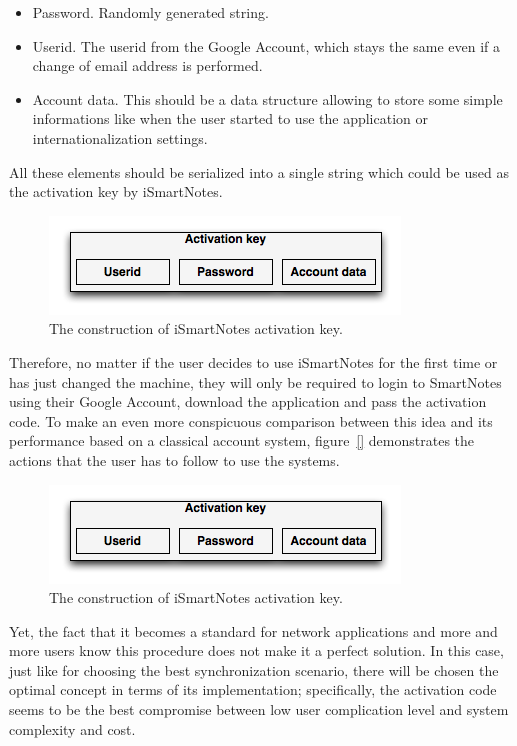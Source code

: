 \begin{itemize}
\item{Password. Randomly generated string.}
\item{Userid. The userid from the Google Account, which stays the same even if a change of email address is performed.}
\item{Account data. This should be a data structure allowing to store some simple informations like when the user started to use the application or internationalization settings.}
\end{itemize}
All these elements should be serialized into a single string which could be used as the activation key by iSmartNotes. 
\begin{figure}[ht]
\begin{center}
\includegraphics[scale=0.6]{charts/activation_key.png}
\caption{The construction of iSmartNotes activation key.}
\label{fig:activation_key}
\end{center}
\end{figure}

Therefore, no matter if the user decides to use iSmartNotes for the first time or has just changed the machine, they will only be required to login to SmartNotes using their Google Account, download the application and pass the activation code. To make an even more conspicuous comparison between this idea and its performance based on a classical account system, figure~\ref{} demonstrates the actions that the user has to follow to use the systems. 
\begin{figure}[ht]
\begin{center}
\includegraphics[scale=0.6]{charts/activation_key.png}
\caption{The construction of iSmartNotes activation key.}
\label{fig:activation_key}
\end{center}
\end{figure}


Yet, the fact that it becomes a standard for network applications and more and more users know this procedure does not make it a perfect solution. In this case, just like for choosing the best synchronization scenario, there will be chosen the optimal concept in terms of its implementation; specifically, the activation code seems to be the best compromise between low user complication level and system complexity and cost.
